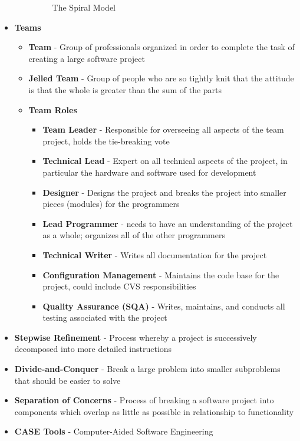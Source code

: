 \documentclass{report}
\begin{document}
\begin{itemize}
\begin{itemize}
\begin{figure}
					\caption{The Spiral Model}
				\end{figure}
			\end{itemize}
		\item \textbf{Teams}
			\begin{itemize}
				\item \textbf{Team} - Group of professionals organized in order to complete the task of creating a large software project
				\item \textbf{Jelled Team} - Group of people who are so tightly knit that the attitude is that the whole is greater than the sum of the parts
				\item \textbf{Team Roles}
					\begin{itemize}
						\item \textbf{Team Leader} - Responsible for overseeing all aspects of the team project, holds the tie-breaking vote
						\item \textbf{Technical Lead} - Expert on all technical aspects of the project, in particular the hardware and software used for development
						\item \textbf{Designer} - Designs the project and breaks the project into smaller pieces (modules) for the programmers
						\item \textbf{Lead Programmer} - needs to have an understanding of the project as a whole; organizes all of the other programmers
						\item \textbf{Technical Writer} - Writes all documentation for the project
						\item \textbf{Configuration Management} - Maintains the code base for the project, could include CVS responsibilities
						\item \textbf{Quality Assurance (SQA)} - Writes, maintains, and conducts all testing associated with the project
					\end{itemize}
			\end{itemize}
		\item \textbf{Stepwise Refinement} - Process whereby a project is successively decomposed into more detailed instructions
		\item \textbf{Divide-and-Conquer} - Break a large problem into smaller subproblems that should be easier to solve
		\item \textbf{Separation of Concerns} - Process of breaking a software project into components which overlap as little as possible in relationship to functionality
		\item \textbf{CASE Tools} - Computer-Aided Software Engineering

\end{itemize}
\end{document}
